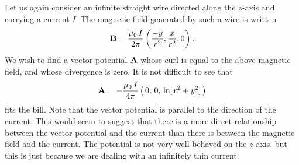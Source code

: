 Let us again consider  an infinite straight wire directed along the $z$-axis and
carrying a current $I$. The magnetic field generated by such a wire is
written
\begin{equation}
{\bf B} = \frac{\mu_0 \,I}{2\pi} \left(\frac{-y}{r^2}, \frac{x}{r^2}, 0\right).
\end{equation}
We wish to find a vector potential ${\bf A}$ 
 whose curl is equal to  the above magnetic field,  and whose divergence is
zero. It is not difficult to see that 
\begin{equation}
{\bf A} = -\frac{\mu_0 \,I}{4\pi} \left(\,0,\,0,\,\ln[x^2+y^2]\,\right)
\end{equation}
fits the bill.
Note that the vector potential is parallel to the direction of the current. This
would seem to suggest that there is a more direct relationship between 
the vector potential and the current than there is between the magnetic field
and the current. The potential is not very well-behaved on the $z$-axis, but this
is just because we are dealing with an infinitely thin current. 

